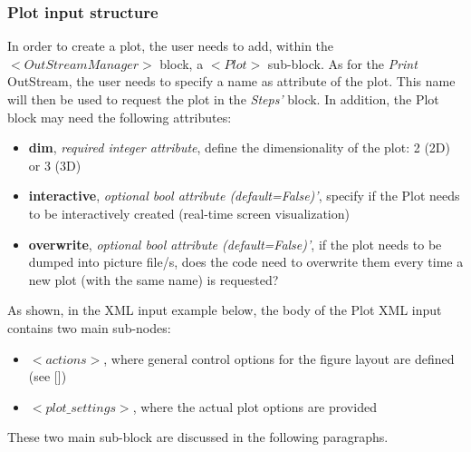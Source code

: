 \subsubsection{Plot input structure \label{sec:PlotInputStructure}}
In order to create a plot, the user needs to add, within the $<OutStreamManager>$ block,  a $<Plot>$ sub-block. As for the \textit{Print}  OutStream, the user needs to specify a name as attribute of the plot. This name will then be used to request the plot in the \textit{Steps'} block. In addition, the Plot block may need the following attributes:
\vspace{-5mm}
\begin{itemize}
\itemsep0em
\item \textbf{dim}, \textit{required integer attribute}, define the dimensionality of the plot: 2 (2D) or 3 (3D)
\item \textbf{interactive}, \textit{optional bool attribute (default=False)'}, specify if the Plot needs to be interactively created (real-time screen visualization)
\item \textbf{overwrite}, \textit{optional bool attribute (default=False)'}, if the plot needs to be dumped into picture file/s, does the code need to overwrite them every time a new plot (with the same name) is requested?
\end{itemize}
\vspace{-5mm}

As shown, in the XML input example below, the body of the Plot XML input contains two main sub-nodes:
\vspace{-5mm}
\begin{itemize}
\itemsep0em
\item$<actions>$, where general control options for the figure layout are defined (see [])
\item $<plot\_settings>$, where the actual plot options are provided
\vspace{-5mm}
\end{itemize}
These two main sub-block are discussed in the following paragraphs.
